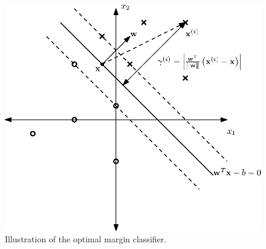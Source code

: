 \begin{figure}[ht!]
	\centering
		\includegraphics{drawings/svm.eps}
	\caption{Illustration of the optimal margin classifier.}
	\label{fig:svm}
\end{figure}

